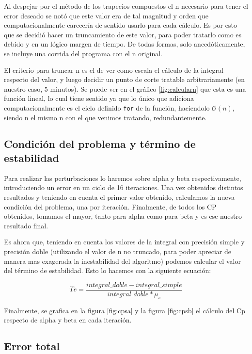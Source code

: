 \documentclass[11pt,a4paper]{article}
\begin{document}
Al despejar por el método de los trapecios compuestos el n necesario para tener el error deseado se notó que este valor era de tal magnitud y orden que computacionalmente carecería de sentido usarlo para cada cálculo. Es por esto que se decidió hacer un truncamiento de este valor, para poder tratarlo como es debido y en un lógico margen de tiempo. De todas formas, solo anecdóticamente, se incluye una corrida del programa con el n original.

El criterio para truncar n es el de ver como escala el cálculo de la integral respecto del valor, y luego decidir un punto de corte tratable arbitrariamente (en nuestro caso, 5 minutos). Se puede ver en el gráfico \ref{fig:calcularn} que esta es una función lineal, lo cual tiene sentido ya que lo único que adiciona computacionalmente es el ciclo definido \texttt{for} de la función, haciendolo \(\mathcal{O}(n)\), siendo n el mismo n con el que venimos tratando, redundantemente.

\subsection{Condición del problema y término de estabilidad}

Para realizar las perturbaciones lo haremos sobre alpha y beta respectivamente, introduciendo un error en un ciclo de 16 iteraciones. Una vez obtenidos distintos resultados y teniendo en cuenta el primer valor obtenido, calculamos la nueva condición del problema, una por iteración. Finalmente, de todos los CP obtenidos, tomamos el mayor, tanto para alpha como para beta y es ese nuestro resultado final.

Es ahora que, teniendo en cuenta los valores de la integral con precisión simple y precisión doble (utilizando el valor de n no truncado, para poder apreciar de manera mas exagerada la inestabilidad del algoritmo) podemos calcular el valor del término de estabilidad. Esto lo hacemos con la siguiente ecuación:


\begin{equation}
    Te = \frac{integral\_doble - integral\_simple}{integral\_doble*\mu_s}
\end{equation}

Finalmente, se grafica en la figura \ref{fig:cpsa} y la figura \ref{fig:cpsb} el cálculo del Cp respecto de alpha y beta en cada iteración.

\subsection{Error total}
\end{document}
